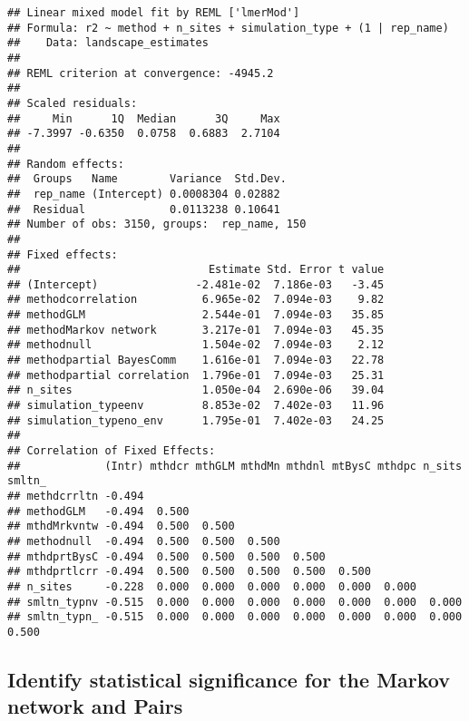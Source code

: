 \documentclass[11pt,]{article}
\begin{document}
\begin{verbatim}
## Linear mixed model fit by REML ['lmerMod']
## Formula: r2 ~ method + n_sites + simulation_type + (1 | rep_name)
##    Data: landscape_estimates
## 
## REML criterion at convergence: -4945.2
## 
## Scaled residuals: 
##     Min      1Q  Median      3Q     Max 
## -7.3997 -0.6350  0.0758  0.6883  2.7104 
## 
## Random effects:
##  Groups   Name        Variance  Std.Dev.
##  rep_name (Intercept) 0.0008304 0.02882 
##  Residual             0.0113238 0.10641 
## Number of obs: 3150, groups:  rep_name, 150
## 
## Fixed effects:
##                             Estimate Std. Error t value
## (Intercept)               -2.481e-02  7.186e-03   -3.45
## methodcorrelation          6.965e-02  7.094e-03    9.82
## methodGLM                  2.544e-01  7.094e-03   35.85
## methodMarkov network       3.217e-01  7.094e-03   45.35
## methodnull                 1.504e-02  7.094e-03    2.12
## methodpartial BayesComm    1.616e-01  7.094e-03   22.78
## methodpartial correlation  1.796e-01  7.094e-03   25.31
## n_sites                    1.050e-04  2.690e-06   39.04
## simulation_typeenv         8.853e-02  7.402e-03   11.96
## simulation_typeno_env      1.795e-01  7.402e-03   24.25
## 
## Correlation of Fixed Effects:
##             (Intr) mthdcr mthGLM mthdMn mthdnl mtBysC mthdpc n_sits smltn_
## methdcrrltn -0.494                                                        
## methodGLM   -0.494  0.500                                                 
## mthdMrkvntw -0.494  0.500  0.500                                          
## methodnull  -0.494  0.500  0.500  0.500                                   
## mthdprtBysC -0.494  0.500  0.500  0.500  0.500                            
## mthdprtlcrr -0.494  0.500  0.500  0.500  0.500  0.500                     
## n_sites     -0.228  0.000  0.000  0.000  0.000  0.000  0.000              
## smltn_typnv -0.515  0.000  0.000  0.000  0.000  0.000  0.000  0.000       
## smltn_typn_ -0.515  0.000  0.000  0.000  0.000  0.000  0.000  0.000  0.500
\end{verbatim}

\subsection{Identify statistical significance for the Markov network and
Pairs}\label{identify-statistical-significance-for-the-markov-network-and-pairs}
\end{document}
